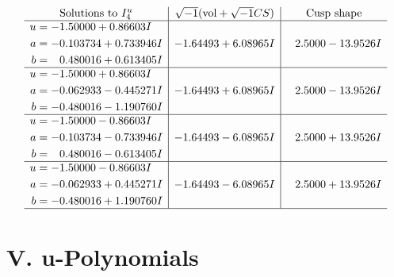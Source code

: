 \documentclass[1p]{elsarticle_modified}
\theoremstyle{definition}
\newcommand{\I}{\sqrt{-1}}
\begin{document}
$$\begin{array}{c|c|c}  
\text{Solutions to }I^u_{4}& \I (\text{vol} + \sqrt{-1}CS) & \text{Cusp shape}\\
 \hline 
\begin{aligned}
u &= -1.50000 + 0.86603 I \\
a &= -0.103734 + 0.733946 I \\
b &= \phantom{-}0.480016 + 0.613405 I\end{aligned}
 & -1.64493 + 6.08965 I & \phantom{-}2.5000 - 13.9526 I \\ \hline\begin{aligned}
u &= -1.50000 + 0.86603 I \\
a &= -0.062933 - 0.445271 I \\
b &= -0.480016 - 1.190760 I\end{aligned}
 & -1.64493 + 6.08965 I & \phantom{-}2.5000 - 13.9526 I \\ \hline\begin{aligned}
u &= -1.50000 - 0.86603 I \\
a &= -0.103734 - 0.733946 I \\
b &= \phantom{-}0.480016 - 0.613405 I\end{aligned}
 & -1.64493 - 6.08965 I & \phantom{-}2.5000 + 13.9526 I \\ \hline\begin{aligned}
u &= -1.50000 - 0.86603 I \\
a &= -0.062933 + 0.445271 I \\
b &= -0.480016 + 1.190760 I\end{aligned}
 & -1.64493 - 6.08965 I & \phantom{-}2.5000 + 13.9526 I\\
 \hline 
 \end{array}$$\newpage
\newpage\renewcommand{\arraystretch}{1}
\centering \section*{ V. u-Polynomials}
\end{document}
